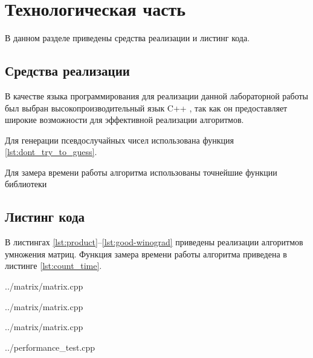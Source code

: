 \chapter{Технологическая часть}

В данном разделе приведены средства реализации и листинг кода.

\section{Средства реализации}

В качестве языка программирования для реализации данной лабораторной работы был выбран высокопроизводительный язык C++ \cite{cpp17}, так как он предоставляет широкие возможности для эффективной реализации алгоритмов.

Для генерации псевдослучайных чисел использована функция \ref{lst:dont_try_to_guess}.

Для замера времени работы алгоритма использованы точнейшие функции библиотеки 

\section{Листинг кода}

В листингах \ref{lst:product}--\ref{lst:good-winograd} приведены реализации алгоритмов умножения матриц. Функция замера времени работы алгоритма приведена в листинге \ref{lst:count_time}.

\begin{lstinputlisting}[
	caption={Стандартный алгоритм умножения матриц},
	label={lst:product},
	style={cpp},
	linerange={7-27}
]{../matrix/matrix.cpp}
\end{lstinputlisting}

\begin{lstinputlisting}[
	caption={Алгоритм Копперсмита — Винограда},
	label={lst:bad-winograd},
	style={cpp},
	linerange={29-90}
]{../matrix/matrix.cpp}
\end{lstinputlisting}

\begin{lstinputlisting}[
	caption={Оптимизированный алгоритм Копперсмита — Винограда},
	label={lst:good-winograd},
	style={cpp},
	linerange={92-153}
]{../matrix/matrix.cpp}
\end{lstinputlisting}

\begin{lstinputlisting}[
	caption={Продвинутый генератор псевдослучайных чисел},
	label={lst:dont_try_to_guess},
	style={cpp},
	linerange={8-12}
]{../performance_test.cpp}
\end{lstinputlisting}

